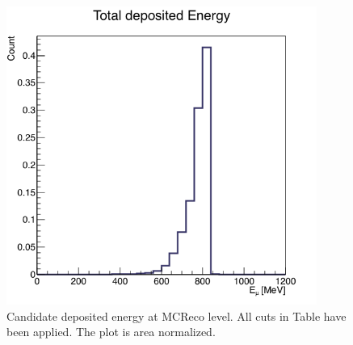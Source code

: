 \documentclass[a4paper, 10pt]{article}
\begin{document}
\begin{figure}[htbp]
\begin{center}
\includegraphics[width=4in]{pMuGamma/ProtonMCEn.png}
\caption{Candidate deposited energy at MCReco level. All cuts in Table \label{T3} have been applied. The plot is area normalized.}
\label{F3}
\end{center}
\end{figure}
\end{document}
